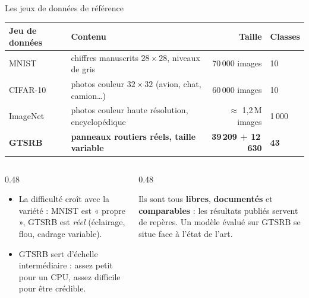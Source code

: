 \begin{frame}{Les jeux de données de référence}
\begin{center}
\footnotesize
\begin{tabular}{@{}llrl@{}}
\toprule
\textbf{Jeu de données} & \textbf{Contenu} & \textbf{Taille} & \textbf{Classes} \\
\midrule
MNIST & chiffres manuscrits $28\times28$, niveaux de gris & 70\,000 images & 10 \\
CIFAR-10 & photos couleur $32\times32$ (avion, chat, camion\dots) & 60\,000 images & 10 \\
ImageNet & photos couleur haute résolution, encyclopédique & $\approx$ 1,2\,M images & 1\,000 \\
\textbf{GTSRB} & \textbf{panneaux routiers réels, taille variable} & \textbf{39\,209 + 12\,630} & \textbf{43} \\
\bottomrule
\end{tabular}
\end{center}
\vspace{1mm}
\begin{columns}[t]
\begin{column}{0.48\textwidth}
\begin{itemize}
  \item La difficulté croît avec la variété : MNIST est « propre », GTSRB est \emph{réel}
  (éclairage, flou, cadrage variable).
  \item GTSRB sert d'échelle intermédiaire : assez petit pour un CPU,
  assez difficile pour être crédible.
\end{itemize}
\end{column}
\begin{column}{0.48\textwidth}
\begin{kbox}
Ils sont tous \textbf{libres}, \textbf{documentés} et \textbf{comparables} : les résultats
publiés servent de repères. Un modèle évalué sur GTSRB se situe face à l'état de l'art.
\end{kbox}
\end{column}
\end{columns}
\end{frame}


